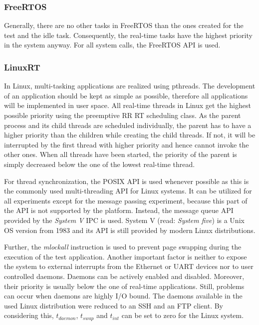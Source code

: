 \subsubsection{FreeRTOS}
Generally, there are no other tasks in FreeRTOS than the ones created for the test and the idle task.
Consequently, the real-time tasks have the highest priority in the system anyway.
For all system calls, the FreeRTOS \ac{API} is used. 

\subsubsection{LinuxRT}\label{ss_linuxRT_application_design}
In Linux, multi-tasking applications are realized using pthreads.
The development of an application should be kept as simple as possible, therefore all applications will be implemented in user space.
All real-time threads in Linux get the highest possible priority using the preemptive \ac{RR} \ac{RT} scheduling class.
As the parent process and its child threads are scheduled individually, the parent has to have a higher priority than the children while creating the child threads.
If not, it will be interrupted by the first thread with higher priority and hence cannot invoke the other ones.
When all threads have been started, the priority of the parent is simply decreased below the one of the lowest real-time thread.
\par
For thread synchronization, the \ac{POSIX} \ac{API} is used whenever possible as this is the commonly used multi-threading \ac{API} for Linux systems.
It can be utilized for all experiments except for the message passing experiment, because this part of the \ac{API} is not supported by the platform.
Instead, the message queue \ac{API} provided by the \textit{System V} \ac{IPC} is used.
System V (read: \textit{System five}) \cite{tlip:svd} is a Unix \ac{OS} version from 1983 and its \ac{API} is still provided by modern Linux distributions.
\par
Further, the \textit{mlockall} instruction is used to prevent page swapping during the execution of the test application.
Another important factor is neither to expose the system to external interrupts from the Ethernet or \ac{UART} devices nor to user controlled daemons.
Daemons can be actively enabled and disabled.
Moreover, their priority is usually below the one of real-time applications.
Still, problems can occur when daemons are highly \ac{I/O} bound.
The daemons available in the used Linux distribution were reduced to an \ac{SSH} and an \ac{FTP} client.
By considering this, $t_{daemon}$, $ t_{swap} $ and $ t_{int} $ can be set to zero for the Linux system.
 
